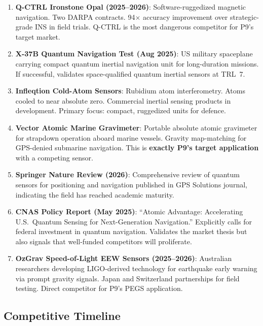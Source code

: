 \documentclass[11pt]{article}
\theoremstyle{definition}
\theoremstyle{remark}
\begin{document}
\begin{enumerate}
  \item \textbf{Q-CTRL Ironstone Opal (2025--2026)}: Software-ruggedized
    magnetic navigation. Two DARPA contracts. 94$\times$ accuracy
    improvement over strategic-grade INS in field trials. Q-CTRL is the
    most dangerous competitor for P9's target market.

  \item \textbf{X-37B Quantum Navigation Test (Aug 2025)}: US military
    spaceplane carrying compact quantum inertial navigation unit for
    long-duration missions. If successful, validates space-qualified
    quantum inertial sensors at TRL~7.

  \item \textbf{Infleqtion Cold-Atom Sensors}: Rubidium atom
    interferometry. Atoms cooled to near absolute zero. Commercial
    inertial sensing products in development. Primary focus: compact,
    ruggedized units for defence.

  \item \textbf{Vector Atomic Marine Gravimeter}: Portable absolute
    atomic gravimeter for strapdown operation aboard marine vessels.
    Gravity map-matching for GPS-denied submarine navigation. This is
    \textbf{exactly P9's target application} with a competing sensor.

  \item \textbf{Springer Nature Review (2026)}: Comprehensive review of
    quantum sensors for positioning and navigation published in GPS
    Solutions journal, indicating the field has reached academic maturity.

  \item \textbf{CNAS Policy Report (May 2025)}: ``Atomic Advantage:
    Accelerating U.S.\ Quantum Sensing for Next-Generation Navigation.''
    Explicitly calls for federal investment in quantum navigation.
    Validates the market thesis but also signals that well-funded
    competitors will proliferate.

  \item \textbf{OzGrav Speed-of-Light EEW Sensors (2025--2026)}: Australian
    researchers developing LIGO-derived technology for earthquake early
    warning via prompt gravity signals. Japan and Switzerland partnerships
    for field testing. Direct competitor for P9's PEGS application.
\end{enumerate}

\subsection{Competitive Timeline}
\end{document}
